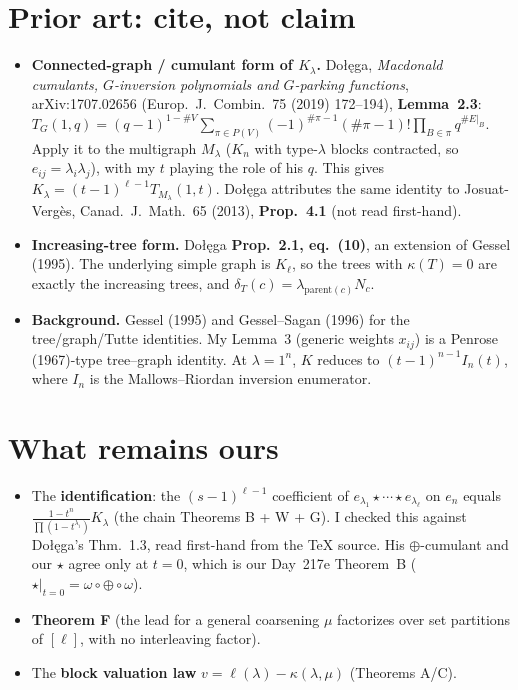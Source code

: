 \documentclass[10pt]{article}
\newcommand{\Dol}{Do\l{}\k{e}ga}
\begin{document}
\section{Prior art: cite, not claim}
\begin{itemize}
\item \textbf{Connected-graph / cumulant form of $K_\lambda$.} \Dol, \emph{Macdonald cumulants, $G$-inversion
  polynomials and $G$-parking functions}, arXiv:1707.02656 (Europ.\ J.\ Combin.\ 75 (2019) 172--194),
  \textbf{Lemma~2.3}:
  $T_G(1,q)=(q-1)^{1-\#V}\sum_{\pi\in P(V)}(-1)^{\#\pi-1}(\#\pi-1)!\prod_{B\in\pi}q^{\#E|_B}$.
  Apply it to the multigraph $M_\lambda$ ($K_n$ with type-$\lambda$ blocks contracted, so $e_{ij}=\lambda_i\lambda_j$),
  with my $t$ playing the role of his $q$. This gives $K_\lambda=(t-1)^{\ell-1}T_{M_\lambda}(1,t)$.
  \Dol{} attributes the same identity to Josuat-Verg\`es, Canad.\ J.\ Math.\ 65 (2013), \textbf{Prop.~4.1}
  (not read first-hand).
\item \textbf{Increasing-tree form.} \Dol{} \textbf{Prop.~2.1, eq.~(10)}, an extension of Gessel (1995). The
  underlying simple graph is $K_\ell$, so the trees with $\kappa(T)=0$ are exactly the increasing trees, and
  $\delta_T(c)=\lambda_{\mathrm{parent}(c)}N_c$.
\item \textbf{Background.} Gessel (1995) and Gessel--Sagan (1996) for the tree/graph/Tutte identities. My Lemma~3
  (generic weights $x_{ij}$) is a Penrose (1967)-type tree--graph identity. At $\lambda=1^n$, $K$ reduces to
  $(t-1)^{n-1}I_n(t)$, where $I_n$ is the Mallows--Riordan inversion enumerator.
\end{itemize}

\section{What remains ours}
\begin{itemize}
\item The \textbf{identification}: the $(s-1)^{\ell-1}$ coefficient of $e_{\lambda_1}\star\cdots\star e_{\lambda_\ell}$
  on $e_n$ equals $\frac{1-t^n}{\prod(1-t^{\lambda_i})}K_\lambda$ (the chain Theorems B + W + G). I checked this
  against \Dol's Thm.~1.3, read first-hand from the TeX source. His $\oplus$-cumulant and our $\star$ agree only at $t=0$,
  which is our Day~217e Theorem~B ($\star|_{t=0}=\omega\circ\oplus\circ\omega$).
\item \textbf{Theorem F} (the lead for a general coarsening $\mu$ factorizes over set partitions of $[\ell]$, with no
  interleaving factor).
\item The \textbf{block valuation law} $v=\ell(\lambda)-\kappa(\lambda,\mu)$ (Theorems A/C).
\end{itemize}
\end{document}
